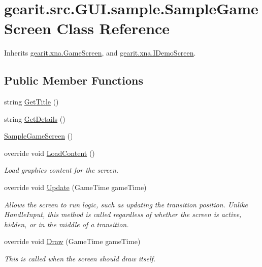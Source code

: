\hypertarget{classgearit_1_1src_1_1_g_u_i_1_1sample_1_1_sample_game_screen}{\section{gearit.\+src.\+G\+U\+I.\+sample.\+Sample\+Game\+Screen Class Reference}
\label{classgearit_1_1src_1_1_g_u_i_1_1sample_1_1_sample_game_screen}
}


Inherits \hyperlink{classgearit_1_1xna_1_1_game_screen}{gearit.\+xna.\+Game\+Screen}, and \hyperlink{interfacegearit_1_1xna_1_1_i_demo_screen}{gearit.\+xna.\+I\+Demo\+Screen}.

\subsection*{Public Member Functions}
\begin{DoxyCompactItemize}
\item 
string \hyperlink{classgearit_1_1src_1_1_g_u_i_1_1sample_1_1_sample_game_screen_a9c4603650b24ee5215c1ce1c9b2c6fff}{Get\+Title} ()
\item 
string \hyperlink{classgearit_1_1src_1_1_g_u_i_1_1sample_1_1_sample_game_screen_a54548d8f106c4fcb10f20f88205c0be8}{Get\+Details} ()
\item 
\hyperlink{classgearit_1_1src_1_1_g_u_i_1_1sample_1_1_sample_game_screen_abceb8e81e8bf74fd78f91c0c199ba28c}{Sample\+Game\+Screen} ()
\item 
override void \hyperlink{classgearit_1_1src_1_1_g_u_i_1_1sample_1_1_sample_game_screen_a95b25f2b02912ca9420a1eaeaabddaf3}{Load\+Content} ()
\begin{DoxyCompactList}\small\item\em Load graphics content for the screen. \end{DoxyCompactList}\item 
override void \hyperlink{classgearit_1_1src_1_1_g_u_i_1_1sample_1_1_sample_game_screen_a6a5bac478ba8abebb10242504f11727c}{Update} (Game\+Time game\+Time)
\begin{DoxyCompactList}\small\item\em Allows the screen to run logic, such as updating the transition position. Unlike Handle\+Input, this method is called regardless of whether the screen is active, hidden, or in the middle of a transition. \end{DoxyCompactList}\item 
override void \hyperlink{classgearit_1_1src_1_1_g_u_i_1_1sample_1_1_sample_game_screen_a2432be4591a7e41cfa002d59b3fe5c10}{Draw} (Game\+Time game\+Time)
\begin{DoxyCompactList}\small\item\em This is called when the screen should draw itself. \end{DoxyCompactList}\end{DoxyCompactItemize}
